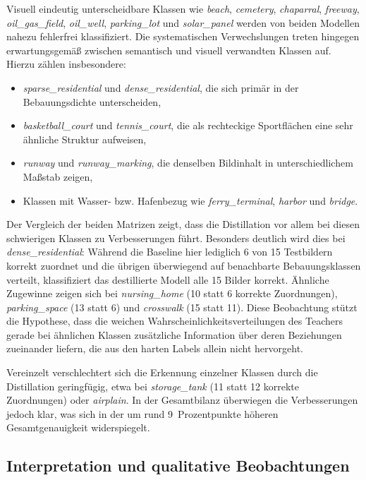 Visuell eindeutig unterscheidbare Klassen wie \textit{beach}, \textit{cemetery}, \textit{chaparral}, \textit{freeway},
\textit{oil\_gas\_field}, \textit{oil\_well}, \textit{parking\_lot} und \textit{solar\_panel} werden von beiden Modellen
nahezu fehlerfrei klassifiziert. Die systematischen Verwechslungen treten hingegen erwartungsgemäß zwischen semantisch
und visuell verwandten Klassen auf. Hierzu zählen insbesondere:
 
\begin{itemize}
	\item \textit{sparse\_residential} und \textit{dense\_residential}, die sich primär in der Bebauungsdichte unterscheiden,
	\item \textit{basketball\_court} und \textit{tennis\_court}, die als rechteckige Sportflächen eine sehr ähnliche Struktur aufweisen,
	\item \textit{runway} und \textit{runway\_marking}, die denselben Bildinhalt in unterschiedlichem Maßstab zeigen,
	\item Klassen mit Wasser- bzw. Hafenbezug wie \textit{ferry\_terminal}, \textit{harbor} und \textit{bridge}.
\end{itemize}
 
Der Vergleich der beiden Matrizen zeigt, dass die Distillation vor allem bei diesen schwierigen Klassen zu Verbesserungen
führt. Besonders deutlich wird dies bei \textit{dense\_residential}: Während die Baseline hier lediglich 6 von 15
Testbildern korrekt zuordnet und die übrigen überwiegend auf benachbarte Bebauungsklassen verteilt, klassifiziert das
destillierte Modell alle 15 Bilder korrekt. Ähnliche Zugewinne zeigen sich bei \textit{nursing\_home}
(10 statt 6 korrekte Zuordnungen), \textit{parking\_space} (13 statt 6) und \textit{crosswalk} (15 statt 11). Diese
Beobachtung stützt die Hypothese, dass die weichen Wahrscheinlichkeitsverteilungen des Teachers gerade bei ähnlichen
Klassen zusätzliche Information über deren Beziehungen zueinander liefern, die aus den harten Labels allein nicht
hervorgeht.
 
Vereinzelt verschlechtert sich die Erkennung einzelner Klassen durch die Distillation geringfügig, etwa bei
\textit{storage\_tank} (11 statt 12 korrekte Zuordnungen) oder \textit{airplain}. In der Gesamtbilanz überwiegen 
die Verbesserungen jedoch klar, was sich in der um rund 9~Prozentpunkte höheren Gesamtgenauigkeit widerspiegelt.
 
\subsection{Interpretation und qualitative Beobachtungen}
 
